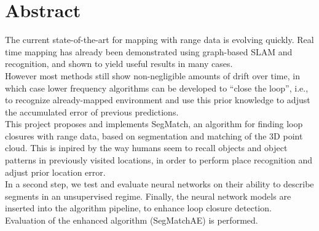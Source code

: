 \chapter*{Abstract}

The current state-of-the-art for mapping with range data is evolving quickly. Real time mapping has already been demonstrated using graph-based SLAM and recognition, and shown to yield useful results in many cases.\\

However most methods still show non-negligible amounts of drift over time, in which case lower frequency algorithms can be developed to “close the loop”, i.e., to recognize already-mapped environment and use this prior knowledge to adjust the accumulated error of previous predictions.\\

This project proposes and implements SegMatch, an algorithm for finding loop closures with range data, based on segmentation and matching of the 3D point cloud. This is inpired by the way humans seem to recall objects and object patterns in previously visited locations, in order to perform place recognition and adjust prior location error.\\

In a second step, we test and evaluate neural networks on their ability to describe segments in an unsupervised regime. Finally, the neural network models are inserted into the algorithm pipeline, to enhance loop closure detection. Evaluation of the enhanced algorithm (SegMatchAE) is performed.\\
